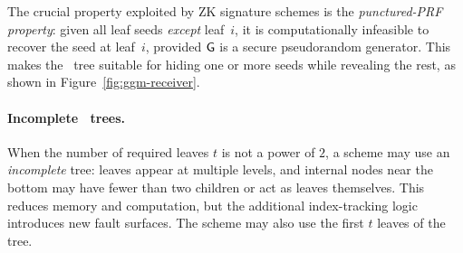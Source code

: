 The crucial property exploited by ZK signature schemes is the
\emph{punctured-PRF property}: given all leaf seeds \emph{except} leaf~$i$, it is
computationally infeasible to recover the seed at leaf~$i$, provided $\mathsf{G}$ is
a secure pseudorandom generator.  This makes the \GGM\ tree suitable for hiding
one or more seeds while revealing the rest, as shown in Figure~\ref{fig:ggm-receiver}.

\paragraph{Incomplete \GGM\ trees.}
When the number of required leaves $t$ is not a power of $2$, a scheme may use an
\emph{incomplete} tree: leaves appear at multiple levels, and internal nodes near
the bottom may have fewer than two children or act as leaves themselves. This
reduces memory and computation, but the additional index-tracking logic introduces
new fault surfaces. The scheme may also use the first $t$ leaves of the tree.
